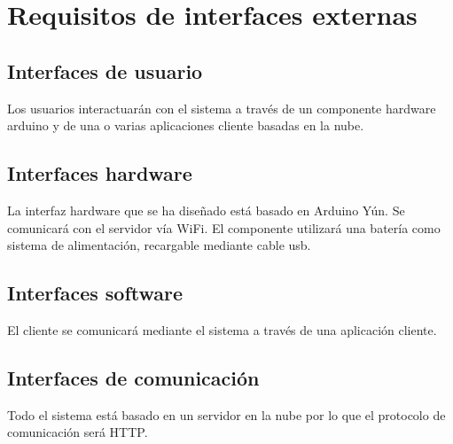 \section{Requisitos de interfaces externas}

\subsection{Interfaces de usuario}

Los usuarios interactuarán con el sistema a través de un componente hardware arduino y de una o varias aplicaciones cliente basadas en la nube.

\subsection{Interfaces hardware}

La interfaz hardware que se ha diseñado está basado en Arduino Yún. Se comunicará con el servidor vía WiFi. El componente utilizará una batería como sistema de alimentación, recargable mediante cable usb.

\subsection{Interfaces software}

El cliente se comunicará mediante el sistema a través de una aplicación cliente.

\subsection{Interfaces de comunicación}

Todo el sistema está basado en un servidor en la nube por lo que el protocolo de comunicación será HTTP.